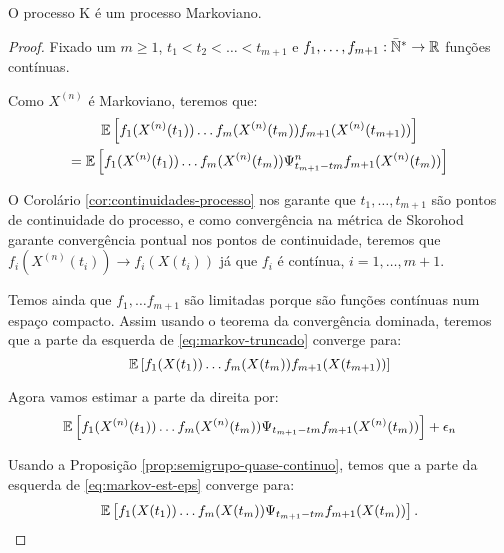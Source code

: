 \begin{teorema}
  \label{teo:proc_markov}
  O processo K é um processo Markoviano.
\end{teorema}

\begin{proof}
  Fixado um $m \geq 1$, $t_1 < t_2 < \ldots < t_{m+1}$ e $f_1, \ldots,
  f_{m+1} : {\mathbb{\bar{N}^*}} \to {\mathbb{R}}$ funções contínuas.

  Como $X^{(n)}$ é Markoviano, teremos que:
  \begin{gather}
    \label{eq:markov-truncado}
    {\mathbb{E}} \left[
      f_{1}(X^{(n)}(t_{1})) 
      \ldots
      f_{m}(X^{(n)}(t_{m})) 
      f_{m+1}(X^{(n)}(t_{m+1})) 
    \right] \notag\\
    = {\mathbb{E}} \left[
      f_{1}(X^{(n)}(t_{1})) 
      \ldots
      f_{m}(X^{(n)}(t_{m})) 
      \Psi^n_{t_{m+1} - t{m}} f_{m+1} (X^{(n)}(t_{m})) 
    \right]
  \end{gather}

  O Corolário \ref{cor:continuidades-processo} nos garante que \qc
  $t_1, \ldots, t_{m+1}$ são pontos de continuidade do processo, e
  como convergência na métrica de Skorohod garante convergência
  pontual nos pontos de continuidade, teremos que $f_i(X^{(n)}(t_i)) \to
  f_i(X(t_i))$ \qc já que $f_i$ é contínua, $i = 1, \ldots, m+1$.

  Temos ainda que $f_1, \ldots f_{m+1}$ são limitadas porque são
  funções contínuas num espaço compacto. Assim usando o teorema da
  convergência dominada, teremos que a parte da esquerda de
  \eqref{eq:markov-truncado} converge para:
  \begin{displaymath}
    {\mathbb{E}} \left[
      f_{1}(X(t_{1})) 
      \ldots
      f_{m}(X(t_{m})) 
      f_{m+1}(X(t_{m+1})) 
    \right]
  \end{displaymath}

  Agora vamos estimar a parte da direita por:
  \begin{equation}
    \label{eq:markov-est-eps}
    {\mathbb{E}} \left[
      f_{1}(X^{(n)}(t_{1})) 
      \ldots
      f_{m}(X^{(n)}(t_{m})) 
      \Psi_{t_{m+1} - t{m}} f_{m+1} (X^{(n)}(t_{m})) 
    \right] + \epsilon_n
  \end{equation}

  Usando a Proposição \ref{prop:semigrupo-quase-continuo}, temos que a
  parte da esquerda de \eqref{eq:markov-est-eps} converge para:
  \begin{displaymath}
    {\mathbb{E}} \left[
      f_{1}(X(t_{1})) 
      \ldots
      f_{m}(X(t_{m})) 
      \Psi_{t_{m+1} - t{m}} f_{m+1} (X(t_{m})) 
    \right].
  \end{displaymath}


\end{proof}
